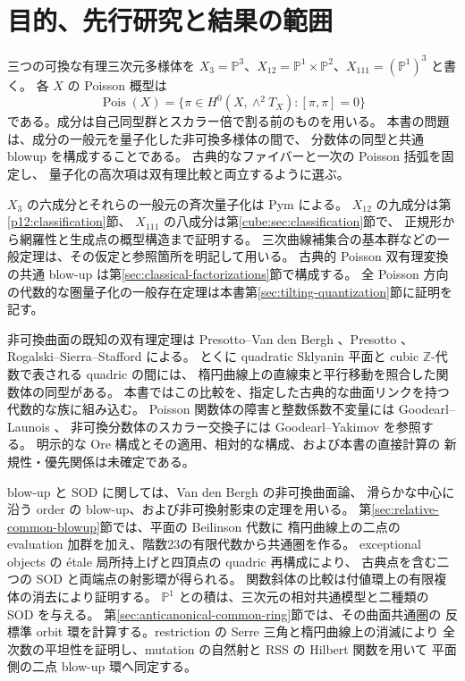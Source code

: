\documentclass[11pt,a4paper]{ltjsarticle}
\theoremstyle{definition}
\newcommand{\PP}{\mathbb P}
\begin{document}
\section{目的、先行研究と結果の範囲}

三つの可換な有理三次元多様体を
$X_3=\PP^3$、$X_{12}=\PP^1\times\PP^2$、$X_{111}=(\PP^1)^3$ と書く。
各 $X$ の Poisson 概型は
\[
 \operatorname{Pois}(X)
 =\{\pi\in H^0(X,\wedge^2T_X):[\pi,\pi]=0\}
\]
である。成分は自己同型群とスカラー倍で割る前のものを用いる。
本書の問題は、成分の一般元を量子化した非可換多様体の間で、
分数体の同型と共通 blowup を構成することである。
古典的なファイバーと一次の Poisson 括弧を固定し、
量子化の高次項は双有理比較と両立するように選ぶ。

$X_3$ の六成分とそれらの一般元の斉次量子化は
Pym \cite[定理1.1、命題2.9、第3節]{Pym2015} による。
$X_{12}$ の九成分は第\ref{p12:classification}節、
$X_{111}$ の八成分は第\ref{cube:sec:classification}節で、
正規形から網羅性と生成点の概型構造まで証明する。
三次曲線補集合の基本群などの一般定理は、その仮定と参照箇所を明記して用いる。
古典的 Poisson 双有理変換の共通 blow-up は第\ref{sec:classical-factorizations}節で構成する。
全 Poisson 方向の代数的な圏量子化の一般存在定理は本書第\ref{sec:tilting-quantization}節に証明を記す。

非可換曲面の既知の双有理定理は
Presotto--Van den Bergh \cite{PVdB2016}、Presotto \cite{Presotto2018}、
Rogalski--Sierra--Stafford \cite{RSS2023} による。
とくに quadratic Sklyanin 平面と cubic $\mathbb Z$-代数で表される quadric の間には、
楕円曲線上の直線束と平行移動を照合した関数体の同型がある。
本書ではこの比較を、指定した古典的な曲面リンクを持つ代数的な族に組み込む。
Poisson 関数体の障害と整数係数不変量には
Goodearl--Launois \cite{GoodearlLaunois}、
非可換分数体のスカラー交換子には
Goodearl--Yakimov \cite{GoodearlYakimov} を参照する。
明示的な Ore 構成とその適用、相対的な構成、および本書の直接計算の
新規性・優先関係は未確定である。

blow-up と SOD に関しては、Van den Bergh の非可換曲面論、
滑らかな中心に沿う order の blow-up、および非可換射影束の定理を用いる。
第\ref{sec:relative-common-blowup}節では、平面の Beilinson 代数に
楕円曲線上の二点の evaluation 加群を加え、階数23の有限代数から共通圏を作る。
exceptional objects の \'etale 局所持上げと四頂点の quadric 再構成により、
古典点を含む二つの SOD と両端点の射影環が得られる。
関数斜体の比較は付値環上の有限複体の消去により証明する。
$\PP^1$ との積は、三次元の相対共通模型と二種類の SOD を与える。
第\ref{sec:anticanonical-common-ring}節では、その曲面共通圏の
反標準 orbit 環を計算する。restriction の Serre 三角と楕円曲線上の消滅により
全次数の平坦性を証明し、mutation の自然射と RSS の Hilbert 関数を用いて
平面側の二点 blow-up 環へ同定する。
\end{document}
